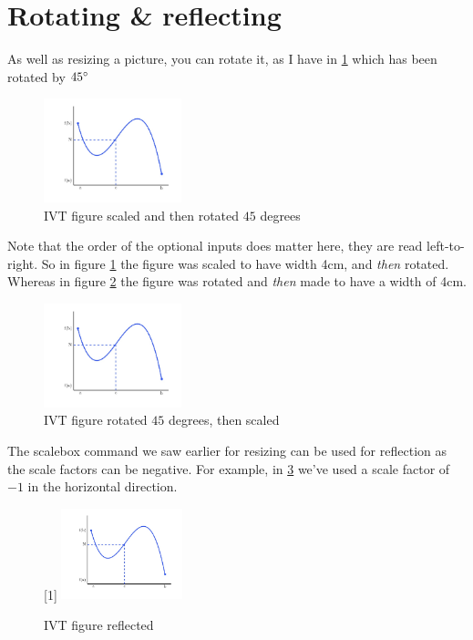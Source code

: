 \documentclass[a4paper,11pt]{article}
\begin{document}
\pagebreak

\section{Rotating \& reflecting}

As well as resizing a picture, you can rotate it, as I have in \ref{fig:IVTscalerotate} which has been rotated by $45\degree$
%
\begin{figure}[hbtp]
	\centering %
	\includegraphics[width=4cm, angle=45]{IVT.jpg} %
	\caption{IVT figure scaled and then rotated $45$ degrees}
	\label{fig:IVTscalerotate}
\end{figure}
%
Note that the order of the optional inputs does matter here, they are read left-to-right. So in figure \ref{fig:IVTscalerotate} the figure was scaled to have width 4cm, and \emph{then} rotated. Whereas in figure \ref{fig:IVTrotatescale} the figure was rotated and \textit{then} made to have a width of 4cm.
%
\begin{figure}[hbtp]
	\centering %
	\includegraphics[angle=45, width=4cm]{IVT.jpg} %
	\caption{IVT figure rotated $45$ degrees, then scaled}
	\label{fig:IVTrotatescale}
\end{figure}
%

The scalebox command we saw earlier for resizing can be used for reflection as the scale factors can be negative. For example, in \ref{fig:IVTflip} we've used a  scale factor of $-1$ in the horizontal direction.
%
\begin{figure}[hbtp]
	\centering %
	\scalebox{-1}[1]{  %
	\includegraphics[width=3.5cm]{IVT.jpg}
	}
	\caption{IVT figure reflected }
	\label{fig:IVTflip}
\end{figure}
%
\pagebreak
\end{document}
